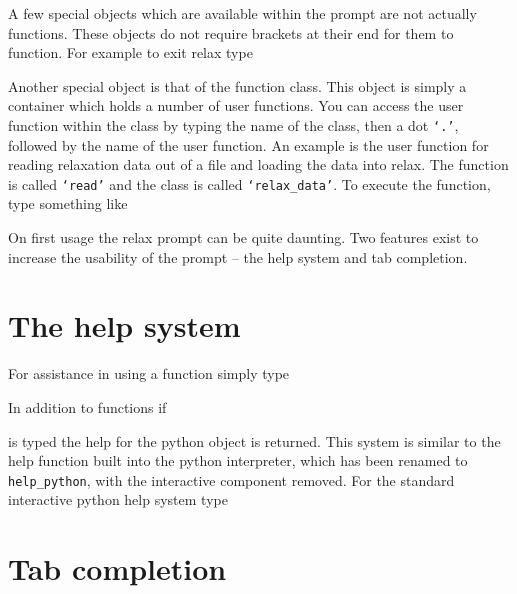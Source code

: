A few special objects which are available within the prompt are not actually functions.  These objects do not require brackets at their end for them to function.  For example to exit relax type


Another special object is that of the function class.  This object is simply a container which holds a number of user functions.  You can access the user function within the class by typing the name of the class, then a dot \texttt{`.'}, followed by the name of the user function.  An example is the user function for reading relaxation data out of a file and loading the data into relax.  The function is called \texttt{`read'} and the class is called \texttt{`relax\_data'}.  To execute the function, type something like


On first usage the relax prompt can be quite daunting.  Two features exist to increase the usability of the prompt -- the help system and tab completion.




\section{The help system}

For assistance in using a function simply type


In addition to functions if


is typed the help for the python object is returned.  This system is similar to the help function built into the python interpreter, which has been renamed to \texttt{help\_python}, with the interactive component removed.  For the standard interactive python help system type






\section{Tab completion}

